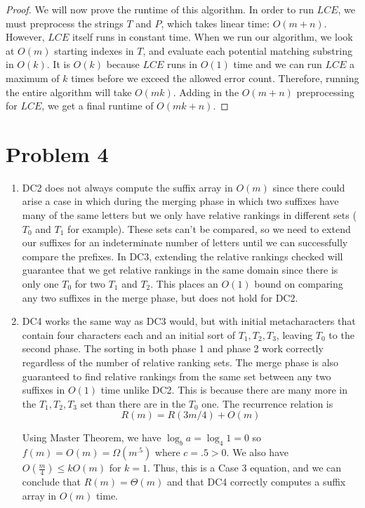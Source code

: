 \documentclass{article}
\theoremstyle{casestyle}
\begin{document}
\begin{proof}
We will now prove the runtime of this algorithm. In order to run $LCE$, we must preprocess the strings $T$ and $P$, which takes linear time: $O(m + n)$. However, $LCE$ itself runs in constant time. When we run our algorithm, we look at $O(m)$ starting indexes in $T$, and evaluate each potential matching substring in $O(k)$. It is $O(k)$ because $LCE$ runs in $O(1)$ time and we can run $LCE$ a maximum of $k$ times before we exceed the allowed error count. Therefore, running the entire algorithm will take $O(mk)$. Adding in the $O(m + n)$ preprocessing for $LCE$, we get a final runtime of $O(mk + n)$.
\end{proof}

\section *{Problem 4}
\begin{enumerate}[i]
\item DC2 does not always compute the suffix array in $O(m)$ since there could arise a case in which during the merging phase in which two suffixes have many of the same letters but we only have relative rankings in different sets ($T_0$ and $T_1$ for example). These sets can't be compared, so we need to extend our suffixes for an indeterminate number of letters until we can successfully compare the prefixes. In DC3, extending the relative rankings checked will guarantee that we get relative rankings in the same domain since there is only one $T_0$ for two $T_1$ and $T_2$. This places an $O(1)$ bound on comparing any two suffixes in the merge phase, but does not hold for DC2.
\item DC4 works the same way as DC3 would, but with initial metacharacters that contain four characters each and an initial sort of $T_1, T_2, T_3$, leaving $T_0$ to the second phase. The sorting in both phase 1 and phase 2 work correctly regardless of the number of relative ranking sets. The merge phase is also guaranteed to find relative rankings from the same set between any two suffixes in $O(1)$ time unlike DC2. This is because there are many more in the $T_1, T_2, T_3$ set than there are in the $T_0$ one. The recurrence relation is \[
    R(m) = R(3m/4) + O(m)
\]

Using Master Theorem, we have $\log_b a = \log_4 1 = 0$ so $f(m) = O(m) = \Omega(m^{.5})$ where $c=.5 > 0$. We also have $O(\frac{m}{4}) \leq kO(m)$ for $k=1$. Thus, this is a Case 3 equation, and we can conclude that $R(m) = \Theta(m)$ and that DC4 correctly computes a suffix array in $O(m)$  time.
 
\end{enumerate}
\end{document}
